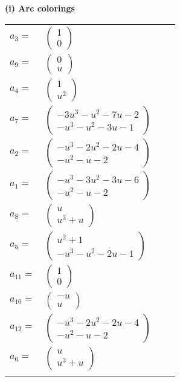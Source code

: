 \documentclass[1p]{elsarticle_modified}
\theoremstyle{definition}
\begin{document}
\flushleft \textbf{(i) Arc colorings}\\
\begin{tabular}{m{7pt} m{180pt} m{7pt} m{180pt} }
\flushright $a_{3}=$&$\begin{pmatrix}1\\0\end{pmatrix}$ \\
\flushright $a_{9}=$&$\begin{pmatrix}0\\u\end{pmatrix}$ \\
\flushright $a_{4}=$&$\begin{pmatrix}1\\u^2\end{pmatrix}$ \\
\flushright $a_{7}=$&$\begin{pmatrix}-3 u^3- u^2-7 u-2\\- u^3- u^2-3 u-1\end{pmatrix}$ \\
\flushright $a_{2}=$&$\begin{pmatrix}- u^3-2 u^2-2 u-4\\- u^2- u-2\end{pmatrix}$ \\
\flushright $a_{1}=$&$\begin{pmatrix}- u^3-3 u^2-3 u-6\\- u^2- u-2\end{pmatrix}$ \\
\flushright $a_{8}=$&$\begin{pmatrix}u\\u^3+u\end{pmatrix}$ \\
\flushright $a_{5}=$&$\begin{pmatrix}u^2+1\\- u^3- u^2-2 u-1\end{pmatrix}$ \\
\flushright $a_{11}=$&$\begin{pmatrix}1\\0\end{pmatrix}$ \\
\flushright $a_{10}=$&$\begin{pmatrix}- u\\u\end{pmatrix}$ \\
\flushright $a_{12}=$&$\begin{pmatrix}- u^3-2 u^2-2 u-4\\- u^2- u-2\end{pmatrix}$ \\
\flushright $a_{6}=$&$\begin{pmatrix}u\\u^3+u\end{pmatrix}$\\&\end{tabular}
\end{document}
